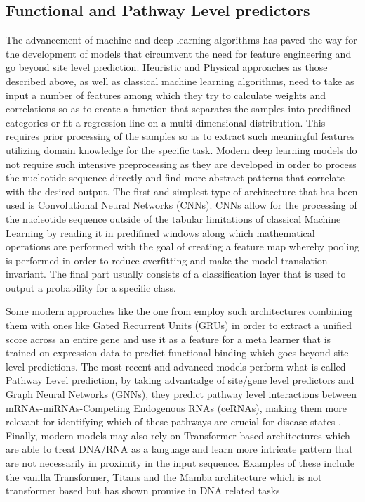 \documentclass[en,ack]{dimscthesis}
\begin{document}
\subsection{Functional and Pathway Level predictors}
\par The advancement of machine and deep learning algorithms has paved the way for the development of models that circumvent the need for feature engineering and go beyond site level prediction. Heuristic and Physical approaches as those described above, as well as classical machine learning algorithms, need to take as input a number of features among which they try to calculate weights and correlations so as to create a function that separates the samples into predifined categories or fit a regression line on a multi-dimensional distribution. This requires prior processing of the samples so as to extract such meaningful features utilizing domain knowledge for the specific task. Modern deep learning models do not require such intensive preprocessing as they are developed in order to process the nucleotide sequence directly and find more abstract patterns that correlate with the desired output. The first and simplest type of architecture that has been used is Convolutional Neural Networks (CNNs). CNNs allow for the processing of the nucleotide sequence outside of the tabular limitations of classical Machine Learning by reading it in predifined windows along which mathematical operations are performed with the goal of creating a feature map whereby pooling is performed in order to reduce overfitting and make the model translation invariant. The final part usually consists of a classification layer that is used to output a probability for a specific class. 

\par Some modern approaches like the one from \cite{zacharopoulouMicroTCNNAvantgardeDeep2024} employ such architectures combining them with ones like Gated Recurrent Units (GRUs) in order to extract a unified score across an entire gene and use it as a feature for a meta learner that is trained on expression data to predict functional binding which goes beyond site level predictions. The most recent and advanced models perform what is called Pathway Level prediction, by taking advantadge of site/gene level predictors and Graph Neural Networks (GNNs), they predict pathway level interactions between mRNAs-miRNAs-Competing Endogenous RNAs (ceRNAs), making them more relevant for identifying which of these pathways are crucial for disease states \parencite{chiuCupidSimultaneousReconstruction2015,jinTransparentSparseGraph2024}. Finally, modern models may also rely on Transformer based architectures which are able to treat DNA/RNA as a language and learn more intricate pattern that are not necessarily in proximity in the input sequence. Examples of these include the vanilla Transformer, Titans and the Mamba architecture which is not transformer based but has shown promise in DNA related tasks \parencite{behrouzTitansLearningMemorize2024,guMambaLinearTimeSequence2024}
\end{document}

